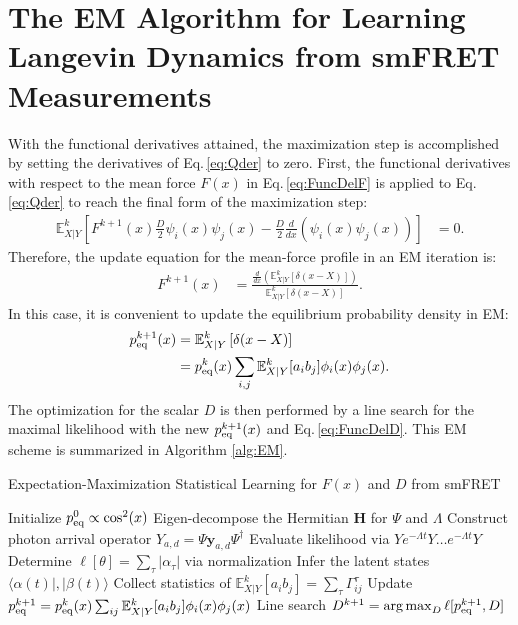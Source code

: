 \documentclass[journal=jpcbfk,manuscript=article,layout=twocolumn,articletitle=true]{achemso}
\DeclareMathOperator*{\argmax}{arg\,max}
\begin{document}
\section{The EM Algorithm for Learning Langevin Dynamics from smFRET Measurements}

With the functional derivatives attained, the maximization step is accomplished by setting the derivatives of Eq.\,\ref{eq:Qder} to zero. First, the functional derivatives with respect to the mean force $F(x)$ in Eq.\,\ref{eq:FuncDelF} is applied to Eq.\,\ref{eq:Qder} to reach the final form of the maximization step: 
\begin{align}
\mathbb{E}^k_{X|Y}\left [F^{k+1}(x)\frac{D}{2} \psi_i(x)\psi_j(x) - \frac{D}{2}\frac{d}{dx}\left( \psi_i(x)\psi_j(x) \right) \right ] &= 0.
\end{align}
Therefore, the update equation for the mean-force profile in an EM iteration is:
\begin{align}
F^{k+1}(x) &= \frac{\frac{d}{dx} (\mathbb{E}^k_{X|Y} [ \delta(x-X) ])}{\mathbb{E}^k_{X|Y} [ \delta(x-X) ] }.
\end{align}
In this case, it is convenient to update the equilibrium probability density in EM:
\begin{align}
p_{\rm eq}^{k+1}(x) &=\mathbb{E}^k_{X|Y} \left[ \delta(x-X) \right] \\
&= p^k_{\rm{eq}}(x) \sum_{i,j} \mathbb{E}^k_{X|Y}[a_ib_j] \phi_i(x)\phi_j(x).
\end{align}
The optimization for the scalar $D$ is then performed by a line search\cite{Nocedal:2006uv} for the maximal likelihood with the new $p_{\rm eq}^{k+1}(x)$ and Eq.\,\ref{eq:FuncDelD}. This EM scheme is summarized in Algorithm \ref{alg:EM}.

\begin{algorithm}[h!]
\caption{\label{alg:EM} Expectation-Maximization Statistical Learning for $F(x)$ and $D$ from smFRET}
\begin{algorithmic}
\State Initialize $p^0_{\rm eq} \propto \cos^2(x)$
\Repeat
\State Eigen-decompose the Hermitian $\bm H$ for $\Psi$ and $\Lambda$ %
\State Construct photon arrival operator $Y_{a,d} = \Psi \bm{y}_{a,d} \Psi^ \dagger$
\State Evaluate likelihood via $Ye^{-\Lambda t}Y \dots e^{-\Lambda t}Y$
\State Determine $\ell [\theta] = \sum_{\tau} |\alpha_{\tau}|$ via normalization
\State Infer the latent states $\langle \alpha(t)|,|\beta(t) \rangle$
\State Collect statistics of $\mathbb{E}^k_{X|Y}[a_ib_j] = \sum_{\tau}\Gamma^{\tau}_{ij}$
\State Update $p_{\rm{eq}}^{k+1} = p^k_{\rm{eq}}(x) \sum_{ij} \mathbb{E}^k_{X|Y}[a_ib_j] \phi_i(x)\phi_j(x) $
\State Line search $D^{k+1} = \argmax_D \ell[p^{k+1}_{\rm eq},D]$
\EndProcedure
\end{algorithmic}
\end{algorithm}
\end{document}
